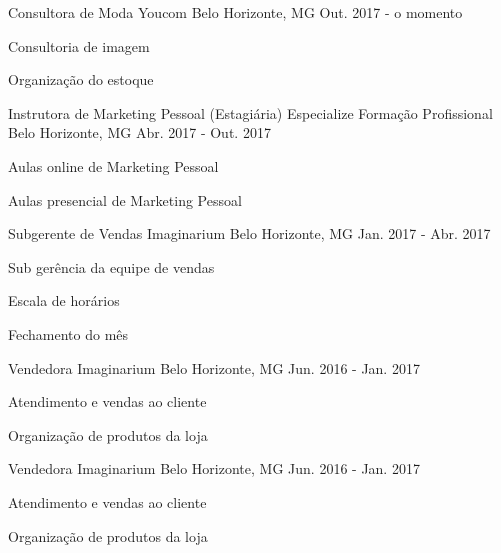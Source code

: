 

  \cventry
    {Consultora de Moda}
    {Youcom}
    {Belo Horizonte, MG}
    {Out. 2017 - o momento}
    {
      \begin{cvitems}
        \item {Consultoria de imagem}
        \item {Organização do estoque}
      \end{cvitems}
    }


  \cventry
    {Instrutora de Marketing Pessoal (Estagiária)}
    {Especialize Formação Profissional}
    {Belo Horizonte, MG}
    {Abr. 2017 - Out. 2017}
    {
      \begin{cvitems}
        \item {Aulas online de Marketing Pessoal}
        \item {Aulas presencial de Marketing Pessoal}
      \end{cvitems}
    }


  \cventry
    {Subgerente de Vendas}
    {Imaginarium}
    {Belo Horizonte, MG}
    {Jan. 2017 - Abr. 2017}
    {
      \begin{cvitems}
        \item {Sub gerência da equipe de vendas}
        \item {Escala de horários}
        \item {Fechamento do mês}
      \end{cvitems}
    }



  \cventry
    {Vendedora}
    {Imaginarium}
    {Belo Horizonte, MG}
    {Jun. 2016 - Jan. 2017}
    {
      \begin{cvitems}
        \item {Atendimento e vendas ao cliente}
        \item {Organização de produtos da loja}
      \end{cvitems}
    }


  \cventry
    {Vendedora}
    {Imaginarium}
    {Belo Horizonte, MG}
    {Jun. 2016 - Jan. 2017}
    {
      \begin{cvitems}
        \item {Atendimento e vendas ao cliente}
        \item {Organização de produtos da loja}
      \end{cvitems}
    }


